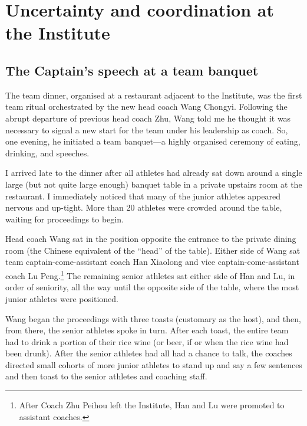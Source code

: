 \chapter{\label{chap:ethnoField} Uncertainty and coordination at the Institute}

\minitoc




\begin{CJK}{UTF8}{gbsn}



\section{The Captain's speech at a team banquet\label{sect:captainsSpeech}}

  The team dinner, organised at a restaurant adjacent to the Institute, was the first team ritual orchestrated by the new head coach Wang Chongyi. Following the abrupt departure of previous head coach Zhu, Wang told me he thought it was necessary to signal a new start for the team under his leadership as coach. So, one evening, he initiated a team banquet---a highly organised ceremony of eating, drinking, and speeches.

  I arrived late to the dinner after all athletes had already sat down around a single large (but not quite large enough) banquet table in a private upstairs room at the restaurant.  I immediately noticed that many of the junior athletes appeared nervous and up-tight. More than 20 athletes were crowded around the table, waiting for proceedings to begin.

  Head coach Wang sat in the position opposite the entrance to the private dining room (the Chinese equivalent of the ``head'' of the table).  Either side of Wang sat team captain-come-assistant coach Han Xiaolong and vice captain-come-assistant coach Lu Peng.\footnote{After Coach Zhu Peihou left the Institute, Han and Lu were promoted to assistant coaches.} The remaining senior athletes sat either side of Han and Lu, in order of seniority, all the way until the opposite side of the table, where the most junior athletes were positioned.

  Wang began the proceedings with three toasts (customary as the host), and then, from there, the senior athletes spoke in turn.  After each toast, the entire team had to drink a portion of their rice wine (or beer, if or when the rice wine had been drunk).  After the senior athletes had all had a chance to talk, the coaches directed small cohorts of more junior athletes to stand up and say a few sentences and then toast to the senior athletes and coaching staff.


\end{CJK}
